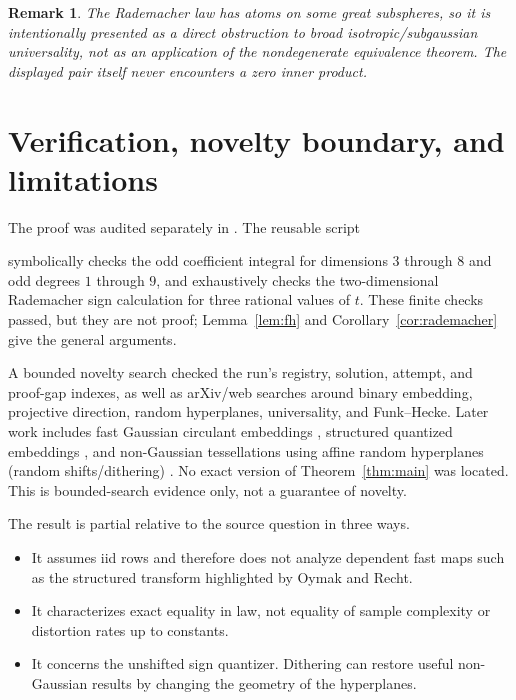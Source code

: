 \documentclass[11pt]{article}
\newtheorem{remark}[theorem]{Remark}
\begin{document}
\begin{remark}
The Rademacher law has atoms on some great subspheres, so it is intentionally
presented as a direct obstruction to broad isotropic/subgaussian universality,
not as an application of the nondegenerate equivalence theorem.  The displayed
pair itself never encounters a zero inner product.
\end{remark}

\section{Verification, novelty boundary, and limitations}

The proof was audited separately in .  The reusable
script
\begin{center}
\end{center}
symbolically checks the odd coefficient integral for dimensions $3$ through
$8$ and odd degrees $1$ through $9$, and exhaustively checks the
two-dimensional Rademacher sign
calculation for three rational values of $t$.  These finite checks passed, but
they are not proof; Lemma~\ref{lem:fh} and Corollary~\ref{cor:rademacher} give
the general arguments.

A bounded novelty search checked the run's registry, solution, attempt, and
proof-gap indexes, as well as arXiv/web searches around binary embedding,
projective direction, random hyperplanes, universality, and Funk--Hecke.
Later work includes fast Gaussian circulant embeddings
\cite{DirksenStollenwerk}, structured quantized embeddings
\cite{HuynhSaab}, and non-Gaussian tessellations using affine random
hyperplanes (random shifts/dithering) \cite{DirksenMendelson}.  No exact version
of Theorem~\ref{thm:main} was located.  This is bounded-search evidence only,
not a guarantee of novelty.

The result is partial relative to the source question in three ways.
\begin{itemize}
\item It assumes iid rows and therefore does not analyze dependent fast maps
such as the structured transform highlighted by Oymak and Recht.
\item It characterizes exact equality in law, not equality of sample
complexity or distortion rates up to constants.
\item It concerns the unshifted sign quantizer.  Dithering can restore useful
non-Gaussian results by changing the geometry of the hyperplanes.
\end{itemize}
\end{document}
